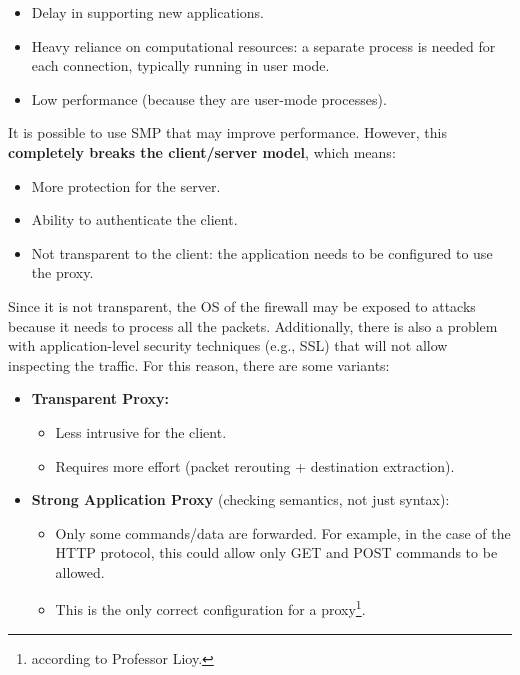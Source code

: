 \begin{itemize}
    \item Delay in supporting new applications.
    \item Heavy reliance on computational resources: a separate process is needed for each connection, typically running in user mode.
    \item Low performance (because they are user-mode processes).
\end{itemize}

It is possible to use SMP that may improve performance. However, this \textbf{completely breaks the client/server model}, which means:

\begin{itemize}
    \item More protection for the server.
    \item Ability to authenticate the client.
    \item Not transparent to the client: the application needs to be configured to use the proxy.
\end{itemize}

Since it is not transparent, the OS of the firewall may be exposed to attacks because it needs to process all the packets. Additionally, there is also a problem with application-level security techniques (e.g., SSL) that will not allow inspecting the traffic. For this reason, there are some variants:

\begin{itemize}
    \item \textbf{Transparent Proxy:}
          \begin{itemize}
              \item Less intrusive for the client.
              \item Requires more effort (packet rerouting + destination extraction).
          \end{itemize}

    \item \textbf{Strong Application Proxy} (checking semantics, not just syntax):
          \begin{itemize}
              \item Only some commands/data are forwarded. For example, in the case of the HTTP protocol, this could allow only GET and POST commands to be allowed.
              \item This is the only correct configuration for a proxy\footnote{according to Professor Lioy.}.
          \end{itemize}
\end{itemize}



